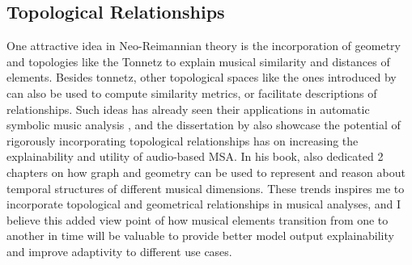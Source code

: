 \subsection{Topological Relationships}
One attractive idea in Neo-Reimannian theory is the incorporation of geometry and topologies like the Tonnetz to explain musical similarity and distances of elements.
Besides tonnetz, other topological spaces like the ones introduced by \cite{callender2008generalized} can also be used to compute similarity metrics, or facilitate descriptions of relationships.
Such ideas has already seen their applications in automatic symbolic music analysis \citep{harte2006}, and the dissertation by \cite{tralie2017geometric} also showcase the potential of rigorously incorporating topological relationships has on increasing the explainability and utility of audio-based MSA.
In his book, \cite{yust2018organized} also dedicated 2 chapters on how graph and geometry can be used to represent and reason about temporal structures of different musical dimensions.
These trends inspires me to incorporate topological and geometrical relationships in musical analyses, and I believe this added view point of how musical elements transition from one to another in time will be valuable to provide better model output explainability and improve adaptivity to different use cases.
